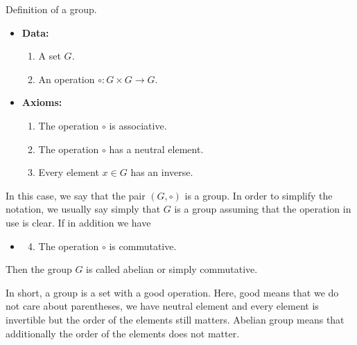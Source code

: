 \begin{definition}
Definition of a group.
\begin{itemize}
\item\textbf{Data:} 
\begin{enumerate}
\item A set $G$.

\item An operation $\circ \colon G\times G\to G$.
\end{enumerate}
\item\textbf{Axioms:}
\begin{enumerate}
\item The operation $\circ$ is associative.

\item The operation $\circ$ has a neutral element.

\item Every element $x\in G$ has an inverse.
\end{enumerate}
\end{itemize}
In this case, we say that the pair $(G, \circ)$ is a group.
In order to simplify the notation, we usually say simply that $G$ is a group assuming that the operation in use is clear.
If in addition we have
\begin{itemize}
\item[]
\begin{enumerate}
\setcounter{enumi}{3}
\item The operation $\circ$ is commutative.
\end{enumerate}
\end{itemize}
Then the group $G$ is called abelian or simply commutative.
\end{definition}


In short, a group is a set with a good operation.
Here, good means that we do not care about parentheses, we have neutral element and every element is invertible but the order of the elements still matters.
Abelian group means that additionally the order of the elements does not matter.

